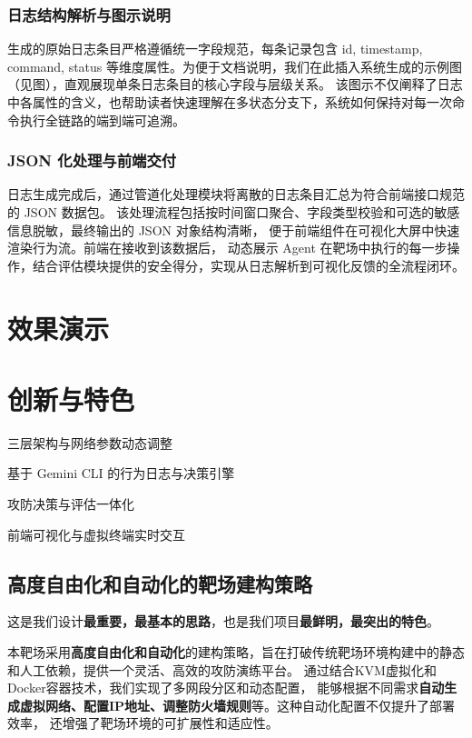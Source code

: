 \documentclass[lang=cn,10pt]{elegantbook}
\begin{document}
\subsection{日志结构解析与图示说明}
生成的原始日志条目严格遵循统一字段规范，每条记录包含 id, timestamp, command, status
等维度属性。为便于文档说明，我们在此插入系统生成的示例图（见图），直观展现单条日志条目的核心字段与层级关系。
该图示不仅阐释了日志中各属性的含义，也帮助读者快速理解在多状态分支下，系统如何保持对每一次命令执行全链路的端到端可追溯。

\subsection{JSON 化处理与前端交付}
日志生成完成后，通过管道化处理模块将离散的日志条目汇总为符合前端接口规范的 JSON 数据包。
该处理流程包括按时间窗口聚合、字段类型校验和可选的敏感信息脱敏，最终输出的 JSON 对象结构清晰，
便于前端组件在可视化大屏中快速渲染行为流。前端在接收到该数据后，
动态展示 Agent 在靶场中执行的每一步操作，结合评估模块提供的安全得分，实现从日志解析到可视化反馈的全流程闭环。



\chapter{效果演示}



\chapter{创新与特色}
\begin{introduction}
  \item 三层架构与网络参数动态调整
  \item 基于 Gemini CLI 的行为日志与决策引擎
  \item 攻防决策与评估一体化
  \item 前端可视化与虚拟终端实时交互
\end{introduction}

\section{高度自由化和自动化的靶场建构策略}
这是我们设计\textbf{最重要，最基本的思路}，也是我们项目\textbf{最鲜明，最突出的特色}。

本靶场采用\textbf{高度自由化和自动化}的建构策略，旨在打破传统靶场环境构建中的静态和人工依赖，提供一个灵活、高效的攻防演练平台。
通过结合KVM虚拟化和Docker容器技术，我们实现了多网段分区和动态配置，
能够根据不同需求\textbf{自动生成虚拟网络、配置IP地址、调整防火墙规则}等。这种自动化配置不仅提升了部署效率，
还增强了靶场环境的可扩展性和适应性。
\end{document}
